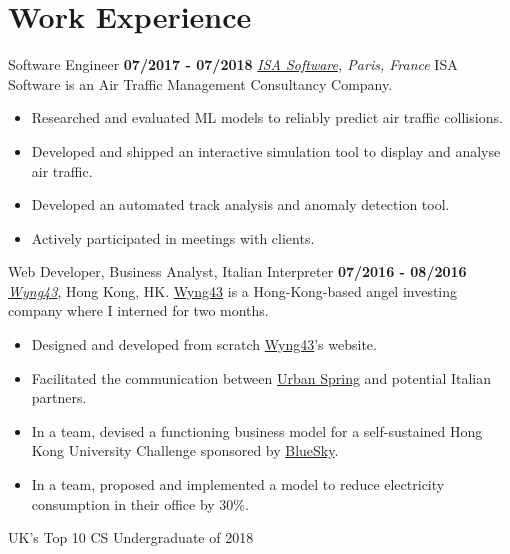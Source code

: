 \documentclass[]{friggeri-cv}
\begin{document}
\section{\color{red}Work \color{gray} Experience}
\begin{entrylist}
  \entry
    {}
    {Software Engineer}
    {\textbf{07/2017 - 07/2018}}
    {\emph{\href{https://www.isa-software.com}{ISA Software}, Paris, France}}
    ISA Software is an Air Traffic Management Consultancy Company.
    \begin{itemize}
        \item Researched and evaluated ML models to reliably predict air traffic collisions.
        \item Developed and shipped an interactive simulation tool to display and analyse air traffic.
        \item Developed an automated track analysis and anomaly detection tool.
        \item Actively participated in meetings with clients.
    \end{itemize}
    
\end{entrylist}
\begin{entrylist}
  \entry
    {}
    {Web Developer, Business Analyst, Italian Interpreter}
    {\textbf{07/2016 - 08/2016}}
    {\emph{\href{http://www.wyng43.com/}{Wyng43}}, Hong Kong, HK}.
    {\href{http://www.wyng43.com/}{Wyng43}} is a Hong-Kong-based angel investing company where I interned for two months.
    \begin{itemize}
        \item Designed and developed from scratch \href{http://www.wyng43.com/}{Wyng43}'s website.
        \item Facilitated the communication between \href{http://www.urbanspring.hk/}{Urban Spring} and potential Italian partners.
        \item In a team, devised a functioning business model for a self-sustained Hong Kong University Challenge sponsored by \href{http://www.hibluesky.co/}{BlueSky}.
        \item In a team, proposed and implemented a model to reduce electricity consumption in their office by 30\%.
    \end{itemize}
\end{entrylist}
\clearpage
\newpage

       {UK's Top 10 CS Undergraduate of 2018}
       
\end{document}

